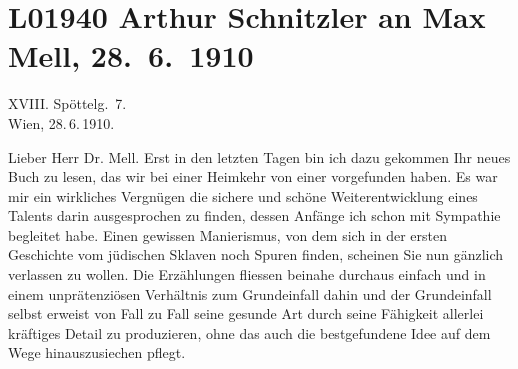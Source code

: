 

\section[Arthur Schnitzler an Max Mell, 28. 6. 1910]{L01940 Arthur Schnitzler an Max Mell, 28. 6. 1910}
\nopagebreak{}
\rehead{ }\normalsize\beginnumbering{}
\toendnotes[C]{\smallbreak\pagebreak[2]}
\toendnotes[C]{\smallbreak}
\pstart
           \raggedleft{}{\pb}XVIII. Spöttelg. 7.{\\}Wien, 28. 6. 1910.\pend
           
\pstart\center{}Lieber Herr Dr. Mell.\pend\vspace{0.5em}
\pstart
           Erst in den letzten Tagen bin ich dazu gekommen Ihr neues Buch zu lesen, das wir bei einer Heimkehr
               von einer \label{K_L01940-1v}\label{K_L01940-1}
               vorgefunden haben. Es war mir ein wirkliches Vergnügen die sichere und schöne
               Weiterentwicklung eines Talents darin ausgesprochen zu finden, dessen Anfänge ich
               schon mit Sympathie begleitet habe. Einen gewissen Manierismus, von dem sich in der
               ersten Geschichte vom jüdischen Sklaven noch
               Spuren finden, scheinen Sie nun gänzlich verlassen zu wollen. Die Erzählungen
               fliessen beinahe durchaus einfach und in einem unprätenziösen Verhältnis zum
               Grundeinfall dahin und der Grundeinfall selbst erweist von Fall zu Fall seine gesunde
               Art durch seine Fähigkeit allerlei kräftiges Detail zu produzieren, ohne das auch die
               bestgefundene Idee auf dem Wege hinauszusiechen pflegt.\pend
           

